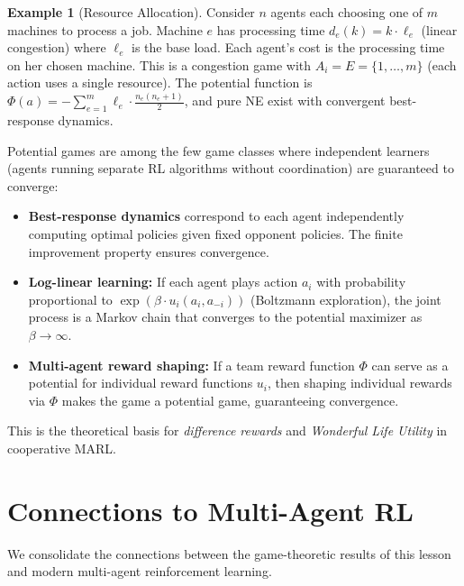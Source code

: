 \documentclass[11pt,a4paper]{article}
\theoremstyle{definition}
\newtheorem{example}{Example}[section]
\theoremstyle{plain}
\theoremstyle{remark}
\begin{document}
\begin{example}[Resource Allocation]
\label{ex:resource-allocation}
Consider $n$ agents each choosing one of $m$ machines to process a job. Machine $e$ has
processing time $d_e(k) = k \cdot \ell_e$ (linear congestion) where $\ell_e$ is the base
load. Each agent's cost is the processing time on her chosen machine. This is a congestion
game with $A_i = E = \{1, \ldots, m\}$ (each action uses a single resource). The potential
function is $\Phi(a) = -\sum_{e=1}^m \ell_e \cdot \frac{n_e(n_e+1)}{2}$, and pure NE exist
with convergent best-response dynamics.
\end{example}

\begin{rlconnection}
Potential games are among the few game classes where independent learners (agents running
separate RL algorithms without coordination) are guaranteed to converge:
\begin{itemize}
    \item \textbf{Best-response dynamics} correspond to each agent independently computing
    optimal policies given fixed opponent policies. The finite improvement property ensures
    convergence.
    \item \textbf{Log-linear learning:} If each agent plays action $a_i$ with probability
    proportional to $\exp(\beta \cdot u_i(a_i, a_{-i}))$ (Boltzmann exploration), the
    joint process is a Markov chain that converges to the potential maximizer as
    $\beta \to \infty$.
    \item \textbf{Multi-agent reward shaping:} If a team reward function $\Phi$ can serve
    as a potential for individual reward functions $u_i$, then shaping individual rewards
    via $\Phi$ makes the game a potential game, guaranteeing convergence.
\end{itemize}
This is the theoretical basis for \emph{difference rewards} and \emph{Wonderful Life
Utility} in cooperative MARL.
\end{rlconnection}


\section{Connections to Multi-Agent RL}
\label{sec:marl-connections}

We consolidate the connections between the game-theoretic results of this lesson and
modern multi-agent reinforcement learning.
\end{document}
